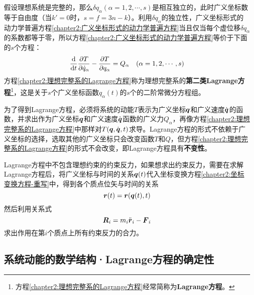 假设理想系统是完整的，那么$\delta q_\alpha(\alpha=1,2,\cdots,s)$是相互独立的，此时广义坐标数等于自由度（当$k'=0$时，$s=f=3n-k$）。利用$\delta q_\alpha$的独立性，广义坐标形式的动力学普遍方程\eqref{chapter2:广义坐标形式的动力学普遍方程}当且仅当每个虚位移$\delta q_\alpha$的系数都等于零，所以方程\eqref{chapter2:广义坐标形式的动力学普遍方程}等价于下面的$s$个方程：
\begin{equation}
	\frac{\mathrm{d}}{\mathrm{d} t} \frac{\partial T}{\partial \dot{q}_\alpha} - \frac{\partial T}{\partial q_\alpha} = Q_\alpha \quad (\alpha = 1,2,\cdots,s)
	\label{chapter2:理想完整系的Lagrange方程}
\end{equation}
方程\eqref{chapter2:理想完整系的Lagrange方程}称为理想完整系的{\bf 第二类Lagrange方程}\footnote{方程\eqref{chapter2:理想完整系的Lagrange方程}经常简称为{\bf Lagrange方程}。}，这是关于$s$个广义坐标函数$q_\alpha(t)$的$s$个的二阶常微分方程组。

为了得到Lagrange方程，必须将系统的动能$T$表示为广义坐标$\boldsymbol{q}$和广义速度$\dot{\boldsymbol{q}}$的函数，并求出作为广义坐标$\boldsymbol{q}$和广义速度$\dot{\boldsymbol{q}}$函数的广义力$Q_\alpha$，再像方程\eqref{chapter2:理想完整系的Lagrange方程}中那样对$T(\boldsymbol{q},\dot{\boldsymbol{q}},t)$求导。Lagrange方程的形式不依赖于广义坐标的选择，选取其他的广义坐标只会改变函数$T$和$Q$，但方程\eqref{chapter2:理想完整系的Lagrange方程}的形式不会改变，即Lagrange方程具有{\bf 不变性}。

Lagrange方程中不包含理想约束的约束反力，如果想求出约束反力，需要在求解Lagrange方程后，将广义坐标与时间的关系$\boldsymbol{q}(t)$代入坐标变换方程\eqref{chapter2:坐标变换方程-重写}中，得到各个质点位矢与时间的关系
\begin{equation*}
	\boldsymbol{r}(t) = \boldsymbol{r}(\boldsymbol{q}(t),t)
\end{equation*}
然后利用关系式
\begin{equation*}
	\boldsymbol{R}_i = m_i\ddot{\boldsymbol{r}}_i - \boldsymbol{F}_i
\end{equation*}
求出作用在第$i$个质点上所有约束反力的合力。

\subsection{系统动能的数学结构·Lagrange方程的确定性}\label{chapter2:subsection-系统动能的数学结构}


